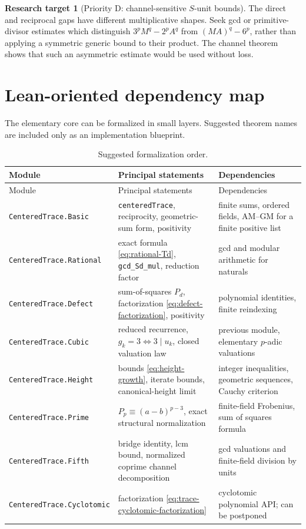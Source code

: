 \documentclass[11pt,oneside]{article}
\theoremstyle{definition}
\newtheorem{target}[theorem]{Research target}
\theoremstyle{remark}
\begin{document}
\begin{target}[Priority D: channel-sensitive \(S\)-unit bounds]
The direct and reciprocal gaps have different multiplicative shapes.  Seek gcd or primitive-
divisor estimates which distinguish
\(3^pM^q-2^pA^q\) from \((MA)^q-6^p\), rather than applying a symmetric generic bound to
their product.  The channel theorem shows that such an asymmetric estimate would be used
without loss.
\end{target}

\section{Lean-oriented dependency map}
\label{sec:lean}

The elementary core can be formalized in small layers.  Suggested theorem names are included
only as an implementation blueprint.

\begin{longtable}{@{}p{}p{}p{}@{}}
\caption{Suggested formalization order.}\label{tab:lean-map}\\
\toprule
Module & Principal statements & Dependencies\\
\midrule
\endfirsthead
\toprule
Module & Principal statements & Dependencies\\
\midrule
\endhead
\texttt{CenteredTrace.Basic}
& \texttt{centeredTrace}, reciprocity, geometric-sum form, positivity
& finite sums, ordered fields, AM--GM for a finite positive list\\
\addlinespace
\texttt{CenteredTrace.Rational}
& exact formula \eqref{eq:rational-Td}, \texttt{gcd\_Sd\_mul}, reduction factor
& gcd and modular arithmetic for naturals\\
\addlinespace
\texttt{CenteredTrace.Defect}
& sum-of-squares \(P_d\), factorization \eqref{eq:defect-factorization}, positivity
& polynomial identities, finite reindexing\\
\addlinespace
\texttt{CenteredTrace.Cubic}
& reduced recurrence, \(g_k=3\iff3\mid u_k\), closed valuation law
& previous module, elementary \(p\)-adic valuations\\
\addlinespace
\texttt{CenteredTrace.Height}
& bounds \eqref{eq:height-growth}, iterate bounds, canonical-height limit
& integer inequalities, geometric sequences, Cauchy criterion\\
\addlinespace
\texttt{CenteredTrace.Prime}
& \(P_p\equiv(a-b)^{p-3}\), exact structural normalization
& finite-field Frobenius, sum of squares formula\\
\addlinespace
\texttt{CenteredTrace.Fifth}
& bridge identity, lcm bound, normalized coprime channel decomposition
& gcd valuations and finite-field division by units\\
\addlinespace
\texttt{CenteredTrace.Cyclotomic}
& factorization \eqref{eq:trace-cyclotomic-factorization}
& cyclotomic polynomial API; can be postponed\\
\bottomrule
\end{longtable}
\end{document}
